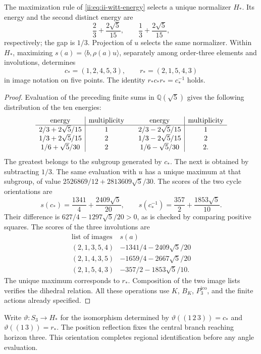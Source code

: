 \begin{proposition}
\label{ii:prop:ii-witt-variational-selection}
The maximization rule of \eqref{ii:eq:ii-witt-energy} selects a unique
normalizer \(H_*\). Its energy and the second distinct energy are
\[
 \frac23+\frac{2\sqrt5}{15},\qquad
 \frac13+\frac{2\sqrt5}{15},
\]
respectively; the gap is \(1/3\). Projection of \(u\)
selects the same normalizer. Within \(H_*\), maximizing
\(s(a)=\langle b,\rho(a)u\rangle\), separately among order-three
elements and involutions, determines
\[
 c_*=(1,2,4,5,3),\qquad r_*=(2,1,5,4,3)
\]
in image notation on five points. The identity
\(r_*c_*r_*=c_*^{-1}\) holds.
\end{proposition}
\begin{proof}
Evaluation of the preceding finite sums in \(\mathbb Q(\sqrt5)\)
gives the following distribution of the ten energies:
\[
\begin{array}{c|c@{\qquad}c|c}
\text{energy}&\text{multiplicity}&\text{energy}&\text{multiplicity}\\ \hline
2/3+2\sqrt5/15&1&2/3-2\sqrt5/15&1\\
1/3+2\sqrt5/15&2&1/3-2\sqrt5/15&2\\
1/6+\sqrt5/30&2&1/6-\sqrt5/30&2.
\end{array}
\]
The greatest belongs to the subgroup generated by \(c_*\). The next is
obtained by subtracting \(1/3\). The same evaluation with \(u\) has a unique
maximum at that subgroup, of value
\(2526869/12+2813609\sqrt5/30\).
The scores of the two cycle orientations are
\[
 s(c_*)=\frac{1341}{4}+\frac{2409\sqrt5}{20},\qquad
 s(c_*^{-1})=\frac{357}{2}+\frac{1853\sqrt5}{10}.
\]
Their difference is \(627/4-1297\sqrt5/20>0\), as is checked
by comparing positive squares. The scores of the three
involutions are
\[
\begin{array}{c|c}
\text{list of images}&s(a)\\ \hline
(2,1,3,5,4)&-1341/4-2409\sqrt5/20\\
(2,1,4,3,5)&-1659/4-2667\sqrt5/20\\
(2,1,5,4,3)&-357/2-1853\sqrt5/10.
\end{array}
\]
The unique maximum corresponds to \(r_*\). Composition of the two image
lists verifies the dihedral relation. All these operations use
\(K\), \(B_K\), \(P_3^{\mathrm{ico}}\), and the finite actions already specified.
\end{proof}

Write \(\vartheta:S_3\to H_*\) for the isomorphism determined
by \(\vartheta((1\,2\,3))=c_*\) and
\(\vartheta((1\,3))=r_*\). The position reflection fixes the central
branch reaching horizon three. This orientation completes
regional identification before any angle evaluation.

